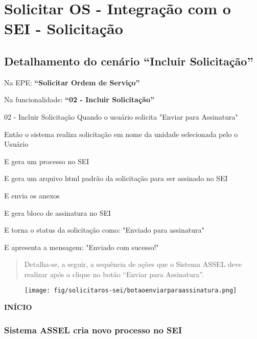 \chapter{Solicitar OS - Integração com o SEI - Solicitação}

\section{Detalhamento do cenário ``Incluir Solicitação''}

Na EPE: \textbf{``Solicitar Ordem de Serviço''}

Na funcionalidade: \textbf{``02 - Incluir Solicitação''}

\begin{nota}[1]{02 - Incluir Solicitação}
	Quando o usuário solicita "Enviar para Assinatura"
	
	Então o sistema realiza solicitação em nome da unidade selecionada pelo o Usuário
	
	E gera um processo no SEI
	
	E gera um arquivo html padrão da solicitação para ser assinado no SEI
	
	E envia os anexos
	
	E gera bloco de assinatura no SEI
	
	E torna o status da solicitação como: "Enviado para assinatura"
	
	E apresenta a mensagem: "Enviado com sucesso!"
\end{nota}


	\begin{quotation}
		\Large
		Detalha-se, a seguir, a sequência de ações que o Sistema ASSEL deve realizar após o clique no botão ``Enviar para Assinatura''.
		\normalsize
	\end{quotation}


	\begin{figure}[htbp!]
	\centering
	\texttt{[image: fig/solicitaros-sei/botaoenviarparaassinatura.png]}
	\end{figure}	

\newpage

\Large
\begin{center}
	\textbf{INÍCIO}
\end{center}
\normalsize

\subsection{Sistema ASSEL cria novo processo no SEI}	
	
